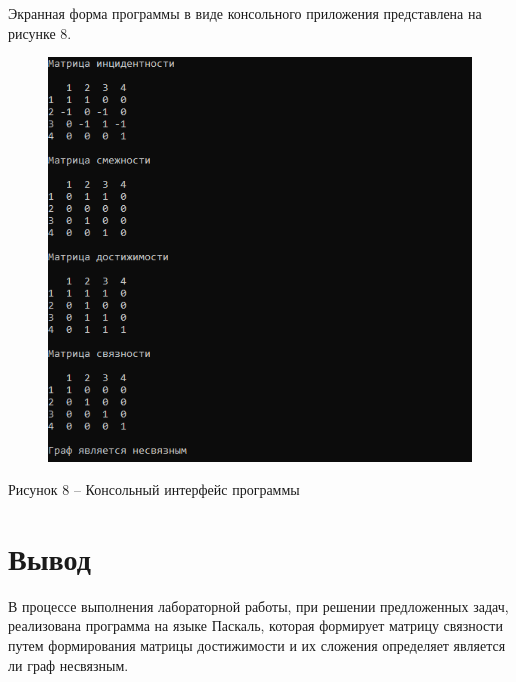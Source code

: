\documentclass[a4paper,14pt]{extarticle}
\begin{document}
  \pagebreak
  Экранная форма программы в виде консольного приложения представлена на рисунке 8.

  \begin{figure}[h]
    \centering
    \includegraphics[width=0.9\linewidth]{images/image.png}
  \end{figure}
  \begin{center}
    Рисунок 8 – Консольный интерфейс программы
  \end{center}

  \section*{\hspace{12.5mm}Вывод}
  В процессе выполнения лабораторной работы, при решении предложенных задач, реализована программа на языке Паскаль, которая формирует матрицу связности путем формирования матрицы достижимости и их сложения определяет является ли граф несвязным.
\end{document}
